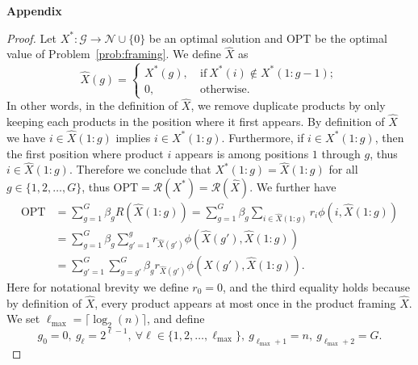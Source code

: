 \documentclass[msom,non-blindrev]{informs3} %
\theoremstyle{definition}
\begin{document}
\begin{appendices}{\Large \noindent\textbf{Appendix}}
{\begin{proof}
Let $X^*:\mathcal{G}\to\mathcal{N}\cup\{0\}$ be an optimal solution and $\text{OPT}$ be the optimal value of Problem~\eqref{prob:framing}. We define $\hat{X}$ as
\begin{equation*}
\hat{X}(g)=\begin{cases}
X^*(g),\ &\text{if}\ X^*(i)\notin X^*(1:g-1);\\
0,\ &\text{otherwise}.
\end{cases}
\end{equation*}
In other words, in the definition of $\hat{X}$, we remove duplicate products by only keeping each products in the position where it first appears. By definition of $\hat{X}$ we have $i\in \hat{X}(1:g)$ implies $i\in X^*(1:g)$. Furthermore, if $i\in X^*(1:g)$, then the first position where product $i$ appears is among positions $1$ through $g$, thus $i\in \hat{X}(1:g)$. Therefore we conclude that $X^*(1:g)=\hat{X}(1:g)$ for all $g\in\{1,2,\dots,G\}$, thus $\text{OPT}=\mathcal{R}(X^*)=\mathcal{R}(\hat{X})$. We further have
\begin{equation}\label{eq:framing_1}
\begin{split}
\text{OPT}&=\sum_{g=1}^G\beta_gR(\hat{X}(1:g))=\sum_{g=1}^G\beta_g\sum_{i\in \hat{X}(1:g)}r_i\phi(i,\hat{X}(1:g))\\
&=\sum_{g=1}^G\beta_g\sum_{g'=1}^g r_{\hat{X}(g')}\phi(\hat{X}(g'),\hat{X}(1:g))\\
&=\sum_{g'=1}^G\sum_{g=g'}^G \beta_g r_{\hat{X}(g')}\phi(\hat{X}(g'),\hat{X}(1:g)).
\end{split}
\end{equation}
Here for notational brevity we define $r_0=0$, and the third equality holds because by definition of $\hat{X}$, every product appears at most once in the product framing $\hat{X}$. We set $\ell_{\max}=\lceil\log_2(n)\rceil$, and define
\begin{equation*}
g_0=0,\ g_\ell=2^{\ell-1},\ \forall \ell\in\{1,2,\dots,\ell_{\max}\},\ g_{\ell_{\max}+1}=n,\ g_{\ell_{\max}+2}=G.
\end{equation*}


\end{proof}}
\end{appendices}
\end{document}
